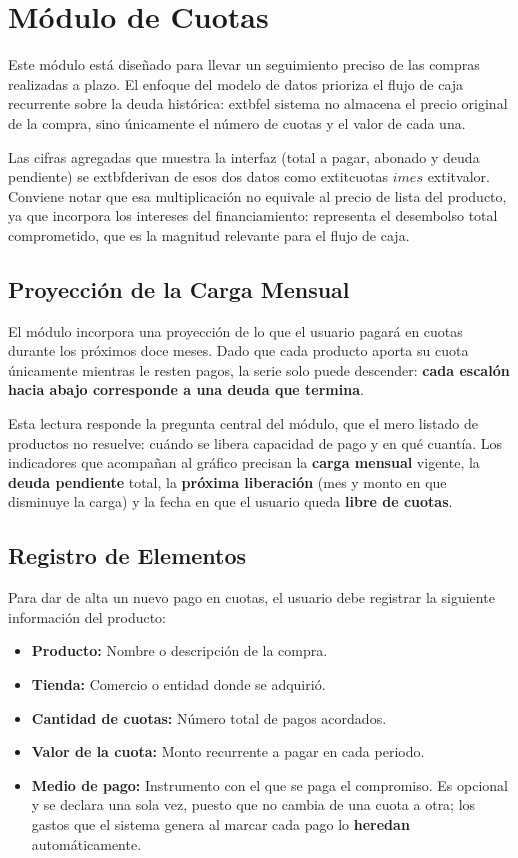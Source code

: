\section{Módulo de Cuotas}
Este módulo está diseñado para llevar un seguimiento preciso de las compras realizadas a plazo. El enfoque del modelo de datos prioriza el flujo de caja recurrente sobre la deuda histórica: 	extbf{el sistema no almacena el precio original de la compra}, sino únicamente el número de cuotas y el valor de cada una.

Las cifras agregadas que muestra la interfaz (total a pagar, abonado y deuda pendiente) se 	extbf{derivan} de esos dos datos como 	extit{cuotas} $	imes$ 	extit{valor}. Conviene notar que esa multiplicación no equivale al precio de lista del producto, ya que incorpora los intereses del financiamiento: representa el desembolso total comprometido, que es la magnitud relevante para el flujo de caja.

\subsection{Proyección de la Carga Mensual}
El módulo incorpora una proyección de lo que el usuario pagará en cuotas durante los próximos doce meses. Dado que cada producto aporta su cuota únicamente mientras le resten pagos, la serie solo puede descender: \textbf{cada escalón hacia abajo corresponde a una deuda que termina}.

Esta lectura responde la pregunta central del módulo, que el mero listado de productos no resuelve: cuándo se libera capacidad de pago y en qué cuantía. Los indicadores que acompañan al gráfico precisan la \textbf{carga mensual} vigente, la \textbf{deuda pendiente} total, la \textbf{próxima liberación} (mes y monto en que disminuye la carga) y la fecha en que el usuario queda \textbf{libre de cuotas}.

\subsection{Registro de Elementos}
Para dar de alta un nuevo pago en cuotas, el usuario debe registrar la siguiente información del producto:
\begin{itemize}
    \item \textbf{Producto:} Nombre o descripción de la compra.
    \item \textbf{Tienda:} Comercio o entidad donde se adquirió.
    \item \textbf{Cantidad de cuotas:} Número total de pagos acordados.
    \item \textbf{Valor de la cuota:} Monto recurrente a pagar en cada periodo.
    \item \textbf{Medio de pago:} Instrumento con el que se paga el compromiso. Es opcional y se declara una sola vez, puesto que no cambia de una cuota a otra; los gastos que el sistema genera al marcar cada pago lo \textbf{heredan} automáticamente.
\end{itemize}

